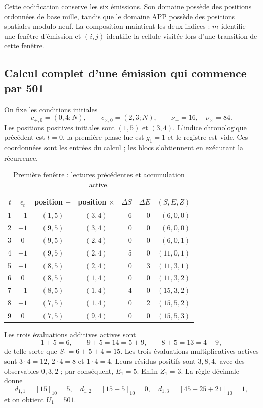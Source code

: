 Cette codification conserve les six émissions. Son domaine possède des positions ordonnées de base mille, tandis que le domaine APP possède des positions spatiales modulo neuf. La composition maintient les deux indices : \(m\) identifie une fenêtre d'émission et \((i,j)\) identifie la cellule visitée lors d'une transition de cette fenêtre.

\subsection{Calcul complet d'une émission qui commence par 501}
\label{act21:tpk:ejemplo501}

On fixe les conditions initiales
\[
 c_{+,0}=(0,4;N),\qquad c_{\times,0}=(2,3;N),
 \qquad \nu_+=16,\quad\nu_\times=84.
\]
Les positions positives initiales sont \((1,5)\) et \((3,4)\). L'indice
chronologique précédent est \(t=0\), la première phase lue est \(g_1=1\) et le
registre est vide. Ces coordonnées sont les entrées
du calcul ; les blocs s'obtiennent en exécutant la récurrence.

\begin{table}[htbp]
\caption{Première fenêtre : lectures précédentes et accumulation active.}
\label{act21:tpk:tabla-501}
\small
\begin{tabular}{@{}rcccrrr@{}}
\toprule
\(t\)&\(\epsilon_t\)&position \(+\)&position \(\times\)&
\(\Delta S\)&\(\Delta E\)&\((S,E,Z)\)\\
\midrule
1&\(+1\)&\((1,5)\)&\((3,4)\)&6&0&\((6,0,0)\)\\
2&\(-1\)&\((9,5)\)&\((3,4)\)&0&0&\((6,0,0)\)\\
3&0&\((9,5)\)&\((2,4)\)&0&0&\((6,0,1)\)\\
4&\(+1\)&\((9,5)\)&\((2,4)\)&5&0&\((11,0,1)\)\\
5&\(-1\)&\((8,5)\)&\((2,4)\)&0&3&\((11,3,1)\)\\
6&0&\((8,5)\)&\((1,4)\)&0&0&\((11,3,2)\)\\
7&\(+1\)&\((8,5)\)&\((1,4)\)&4&0&\((15,3,2)\)\\
8&\(-1\)&\((7,5)\)&\((1,4)\)&0&2&\((15,5,2)\)\\
9&0&\((7,5)\)&\((9,4)\)&0&0&\((15,5,3)\)\\
\bottomrule
\end{tabular}
\end{table}

Les trois évaluations additives actives sont
\[
 1+5=6,\qquad9+5=14=5+9,\qquad8+5=13=4+9,
\]
de telle sorte que \(S_1=6+5+4=15\). Les trois évaluations multiplicatives actives
sont \(3\cdot4=12\), \(2\cdot4=8\) et \(1\cdot4=4\). Leurs résidus
positifs sont \(3,8,4\), avec des observables \(0,3,2\) ; par conséquent,
\(E_1=5\). Enfin \(Z_1=3\). La règle décimale donne
\[
 d_{1,1}=[15]_{10}=5,\quad
 d_{1,2}=[15+5]_{10}=0,\quad
 d_{1,3}=[45+25+21]_{10}=1,
\]
et on obtient \(U_1=501\).

